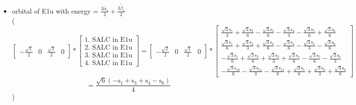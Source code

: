 \documentclass[12pt,a4paper]{article}
\begin{document}
\begin{itemize}
\textcolor{red}{Error in Orthogonalization of SALCs}\item orbital of E1u with energy = 
                                $\frac{3 \tilde{\alpha}_{s}}{2} + \frac{3 \tilde{\beta}_{s}}{2}$ \\
( 
$$
\left[\begin{matrix}- \frac{\sqrt{2}}{2} & 0 & \frac{\sqrt{2}}{2} & 0\end{matrix}\right] * \left[\begin{array}{c}\text{1. SALC in E1u} \\ \text{2. SALC in E1u} \\ \text{3. SALC in E1u} \\ \text{4. SALC in E1u}\end{array}\right] = \left[\begin{matrix}- \frac{\sqrt{2}}{2} & 0 & \frac{\sqrt{2}}{2} & 0\end{matrix}\right] * \left[\begin{matrix}\frac{\sqrt{3} \text{s}_{1}}{3} + \frac{\sqrt{3} \text{s}_{2}}{6} - \frac{\sqrt{3} \text{s}_{3}}{6} - \frac{\sqrt{3} \text{s}_{4}}{3} - \frac{\sqrt{3} \text{s}_{5}}{6} + \frac{\sqrt{3} \text{s}_{6}}{6}\\\frac{\sqrt{3} \text{s}_{1}}{6} + \frac{\sqrt{3} \text{s}_{2}}{3} + \frac{\sqrt{3} \text{s}_{3}}{6} - \frac{\sqrt{3} \text{s}_{4}}{6} - \frac{\sqrt{3} \text{s}_{5}}{3} - \frac{\sqrt{3} \text{s}_{6}}{6}\\- \frac{\sqrt{3} \text{s}_{1}}{6} + \frac{\sqrt{3} \text{s}_{2}}{6} + \frac{\sqrt{3} \text{s}_{3}}{3} + \frac{\sqrt{3} \text{s}_{4}}{6} - \frac{\sqrt{3} \text{s}_{5}}{6} - \frac{\sqrt{3} \text{s}_{6}}{3}\\- \frac{\sqrt{3} \text{s}_{10}}{6} - \frac{\sqrt{3} \text{s}_{11}}{3} - \frac{\sqrt{3} \text{s}_{12}}{6} + \frac{\sqrt{3} \text{s}_{7}}{6} + \frac{\sqrt{3} \text{s}_{8}}{3} + \frac{\sqrt{3} \text{s}_{9}}{6}\end{matrix}\right] 
 $$ $$ = \frac{\sqrt{6} \left(- \text{s}_{1} + \text{s}_{3} + \text{s}_{4} - \text{s}_{6}\right)}{4} 
 $$ 
 )


\end{itemize}
\end{document}
